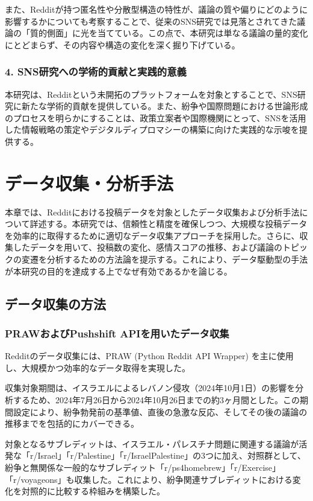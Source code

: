 \documentclass[11pt, a4j]{jreport}
\begin{document}
    また、Redditが持つ匿名性や分散型構造の特性が、議論の質や偏りにどのように影響するかについても考察することで、従来のSNS研究では見落とされてきた議論の「質的側面」に光を当てている。この点で、本研究は単なる議論の量的変化にとどまらず、その内容や構造の変化を深く掘り下げている。

    \subsection*{4. SNS研究への学術的貢献と実践的意義}
    本研究は、Redditという未開拓のプラットフォームを対象とすることで、SNS研究に新たな学術的貢献を提供している。また、紛争や国際問題における世論形成のプロセスを明らかにすることは、政策立案者や国際機関にとって、SNSを活用した情報戦略の策定やデジタルディプロマシーの構築に向けた実践的な示唆を提供する。

    \chapter{データ収集・分析手法}
    本章では、Redditにおける投稿データを対象としたデータ収集および分析手法について詳述する。本研究では、信頼性と精度を確保しつつ、大規模な投稿データを効率的に取得するために適切なデータ収集アプローチを採用した。さらに、収集したデータを用いて、投稿数の変化、感情スコアの推移、および議論のトピックの変遷を分析するための方法論を提示する。これにより、データ駆動型の手法が本研究の目的を達成する上でなぜ有効であるかを論じる。

    \section{データ収集の方法}
    \subsection{PRAWおよびPushshift APIを用いたデータ収集}
    Redditのデータ収集には、PRAW (Python Reddit API Wrapper) を主に使用し、大規模かつ効率的なデータ取得を実現した。

    収集対象期間は、イスラエルによるレバノン侵攻（2024年10月1日）の影響を分析するため、2024年7月26日から2024年10月26日までの約3ヶ月間とした。この期間設定により、紛争勃発前の基準値、直後の急激な反応、そしてその後の議論の推移までを包括的にカバーできる。

    対象となるサブレディットは、イスラエル・パレスチナ問題に関連する議論が活発な「r/Israel」「r/Palestine」「r/IsraelPalestine」の3つに加え、対照群として、紛争と無関係な一般的なサブレディット「r/ps4homebrew」「r/Exercise」「r/voyageons」も収集した。これにより、紛争関連サブレディットにおける変化を対照的に比較する枠組みを構築した。
\end{document}
